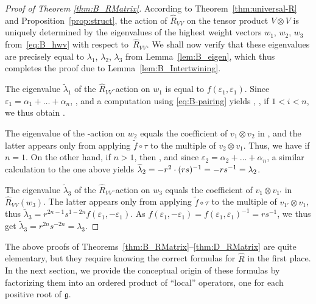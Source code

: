 \documentclass[10pt,a4paper]{amsart}
\numberwithin{equation}{section}
\newcommand{\fg}{\mathfrak{g}}
\begin{document}
\begin{proof}[Proof of Theorem \ref{thm:B_RMatrix}]
According to Theorem~\ref{thm:universal-R} and Proposition~\ref{prop:struct}, the action of $\hat{R}_{VV}$ on the tensor product $V\otimes V$ is uniquely determined by the eigenvalues of the highest weight vectors $w_1$, $w_2$, $w_3$ from~\eqref{eq:B_hwv} with respect to~$\hat{R}_{VV}$. We shall now verify that these eigenvalues are precisely equal to $\lambda_1$, $\lambda_2$, $\lambda_3$ from Lemma~\ref{lem:B_eigen}, which thus completes the proof due to Lemma~\ref{lem:B_Intertwining}.

The eigenvalue $\widetilde{\lambda}_1$ of the $\hat{R}_{VV}$-action on $w_1$ is equal to $f(\varepsilon_{1},\varepsilon_{1})$. Since $\varepsilon_1=\alpha_1+\dots+\alpha_n$, , and a computation using \eqref{eq:B-pairing} yields , ,  if $1<i<n$, we thus obtain .


The eigenvalue  of the -action on $w_2$ equals the coefficient of $v_1\otimes v_2$ in , and the latter appears only from applying $\widetilde{f}\circ \tau$ to the multiple of $v_2\otimes v_1$. Thus, we have  if $n = 1$. On the other hand, if $n > 1$, then , and since $\varepsilon_2=\alpha_2+\dots+\alpha_n$, a similar calculation to the one above yields $\smash{\widetilde{\lambda}_2}=-r^2\cdot (rs)^{-1}=-rs^{-1}=\lambda_2$.


The eigenvalue $\widetilde{\lambda}_3$ of the $\hat{R}_{VV}$-action on $w_3$ equals the coefficient of $v_1\otimes v_{1'}$ in $\hat{R}_{VV}(w_3)$. The latter appears only from applying $\widetilde{f}\circ \tau$ to the multiple of $v_{1'}\otimes v_1$, thus $\widetilde{\lambda}_3=r^{2n-1}s^{1-2n} f(\varepsilon_1,-\varepsilon_1)$. As $f(\varepsilon_1,-\varepsilon_1)=f(\varepsilon_1,\varepsilon_1)^{-1}=rs^{-1}$, we thus get $\widetilde{\lambda}_3=r^{2n}s^{-2n}=\lambda_3$.
\end{proof}

\begin{Remark}\label{rem:easy-finite}
The above proofs of Theorems~\ref{thm:B_RMatrix}--\ref{thm:D_RMatrix} are quite elementary, but they require knowing the correct formulas for $\hat{R}$ in the first place. In the next section, we provide the conceptual origin of these formulas by factorizing them into an ordered product of ``local'' operators, one for each positive root of $\fg$.
\end{Remark}
\end{document}
